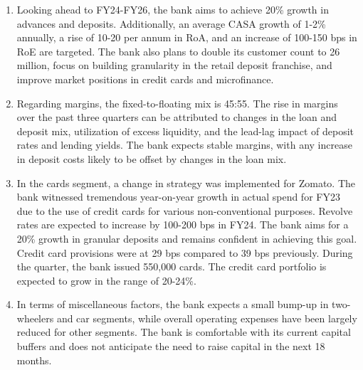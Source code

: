 \begin{enumerate}
    \item Looking ahead to FY24-FY26, the bank aims to achieve 20\% growth in advances and deposits. Additionally, an average CASA growth of 1-2\% annually, a rise of 10-20 per annum in RoA, and an increase of 100-150 bps in RoE are targeted. The bank also plans to double its customer count to 26 million, focus on building granularity in the retail deposit franchise, and improve market positions in credit cards and microfinance.
    
    \item Regarding margins, the fixed-to-floating mix is 45:55. The rise in margins over the past three quarters can be attributed to changes in the loan and deposit mix, utilization of excess liquidity, and the lead-lag impact of deposit rates and lending yields. The bank expects stable margins, with any increase in deposit costs likely to be offset by changes in the loan mix.
    
    \item In the cards segment, a change in strategy was implemented for Zomato. The bank witnessed tremendous year-on-year growth in actual spend for FY23 due to the use of credit cards for various non-conventional purposes. Revolve rates are expected to increase by 100-200 bps in FY24. The bank aims for a 20\% growth in granular deposits and remains confident in achieving this goal. Credit card provisions were at 29 bps compared to 39 bps previously. During the quarter, the bank issued 550,000 cards. The credit card portfolio is expected to grow in the range of 20-24\%.
    
    \item In terms of miscellaneous factors, the bank expects a small bump-up in two-wheelers and car segments, while overall operating expenses have been largely reduced for other segments. The bank is comfortable with its current capital buffers and does not anticipate the need to raise capital in the next 18 months.
\end{enumerate}

